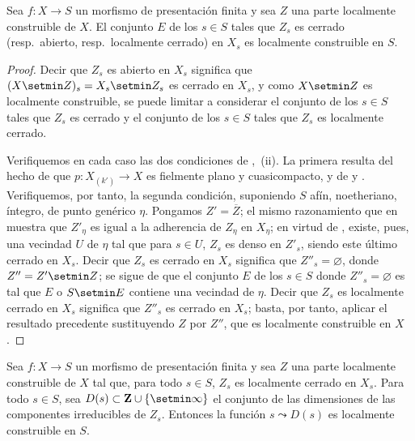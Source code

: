\begin{corollary}[9.5.4]
\label{IV.9.5.4}
Sea $f:X\to S$ un morfismo de presentación finita y sea $Z$ una parte localmente construible de $X$.
El conjunto $E$ de los $s\in S$ tales que $Z_s$ es cerrado \textup{(resp.}\ abierto, \textup{resp.}\ localmente cerrado\textup{)} en $X_s$ es localmente construible en $S$.
\end{corollary}

\begin{proof}
Decir que $Z_s$ es abierto en $X_s$ significa que $(X\setmin Z)_s=X_s\setmin Z_s$ es cerrado en $X_s$, y como $X\setmin Z$ es localmente construible, se puede limitar a considerar el conjunto de los $s\in S$ tales que $Z_s$ es cerrado y el conjunto de los $s\in S$ tales que $Z_s$ es localmente cerrado.

Verifiquemos en cada caso las dos condiciones de ,~(ii).
La primera resulta del hecho de que $p:X_{(k')}\to X$ es fielmente plano y cuasicompacto, y de  y .
Verifiquemos, por tanto, la segunda condición, suponiendo $S$ afín, noetheriano, íntegro, de punto genérico $\eta$.
Pongamos $Z'=\overline Z$; el mismo razonamiento que en  muestra que $Z'_\eta$ es igual a la adherencia de $Z_\eta$ en $X_\eta$; en virtud de , existe, pues, una vecindad $U$ de $\eta$ tal que para $s\in U$, $Z_s$ es denso en $Z'_s$, siendo este último cerrado en $X_s$.
Decir que $Z_s$ es cerrado en $X_s$ significa que $Z''_s=\varnothing$, donde $Z''=Z'\setmin Z$; se sigue de  que el conjunto $E$ de los $s\in S$ donde $Z''_s=\varnothing$ es tal que $E$ o $S\setmin E$ contiene una vecindad de $\eta$.
Decir que $Z_s$ es localmente cerrado en $X_s$ significa que $Z''_s$ es cerrado en $X_s$; basta, por tanto, aplicar el resultado precedente sustituyendo $Z$ por $Z''$, que es localmente construible en $X$.
\end{proof}


\begin{proposition}[9.5.5]
\label{IV.9.5.5}
Sea $f:X\to S$ un morfismo de presentación finita y sea $Z$ una parte localmente construible de $X$ tal que, para todo $s\in S$, $Z_s$ es localmente cerrado en $X_s$.
Para todo $s\in S$, sea $D(s)\subset\mathbf Z\cup\{\setmin\infty\}$ el conjunto de las dimensiones de las componentes irreducibles de $Z_s$.
Entonces la función $s\leadsto D(s)$ es localmente construible en $S$.
\end{proposition}

